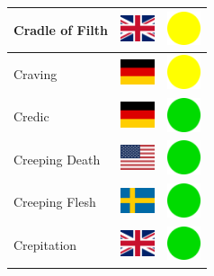 \documentclass[12pt, a4paper, twoside]{report}
\begin{document}
\begin{center}
\begin{longtable}{|p{5cm}|p{2cm}|p{2cm}|}
 Cradle of Filth                                            & \includegraphics[width=1cm]{../4x3/gb} &   \includegraphics[width=1cm]{../likes/m} \\ \hline
 Craving                                                    & \includegraphics[width=1cm]{../4x3/de} &   \includegraphics[width=1cm]{../likes/m} \\ \hline
 Credic                                                     & \includegraphics[width=1cm]{../4x3/de} &   \includegraphics[width=1cm]{../likes/y} \\ \hline
 Creeping Death                                             & \includegraphics[width=1cm]{../4x3/us} &   \includegraphics[width=1cm]{../likes/y} \\ \hline
 Creeping Flesh                                             & \includegraphics[width=1cm]{../4x3/se} &   \includegraphics[width=1cm]{../likes/y} \\ \hline
 Crepitation                                                & \includegraphics[width=1cm]{../4x3/gb} &   \includegraphics[width=1cm]{../likes/y} \\ \hline

\end{longtable}
\end{center}
\end{document}
